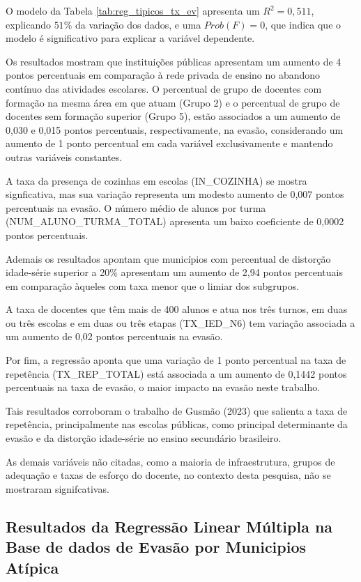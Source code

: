 \documentclass[english, spanish, brazilian]{RBIEarticle} %
\begin{document}
O modelo da Tabela \ref{tab:reg_tipicos_tx_ev} apresenta um $R^2=0,511$, explicando $51\%$ da variação dos dados, e uma $Prob(F)=0$, que indica que o modelo é significativo para explicar a variável dependente.

Os resultados mostram que instituições públicas apresentam um aumento de 4 pontos percentuais em comparação à rede privada de ensino no abandono contínuo das atividades escolares.
O percentual de grupo de docentes com formação na mesma área em que atuam (Grupo 2) e o percentual de grupo de docentes sem formação superior (Grupo 5), estão associados a um aumento de 0,030 e 0,015 pontos percentuais, respectivamente, na evasão, considerando um aumento de 1 ponto percentual em cada variável exclusivamente e mantendo outras variáveis constantes.

A taxa da presença de cozinhas em escolas (IN\_COZINHA) se mostra signficativa, mas sua variação representa um modesto aumento de 0,007 pontos percentuais na evasão. O número médio de alunos por turma (NUM\_ALUNO\_TURMA\_TOTAL) apresenta um baixo coeficiente de 0,0002 pontos percentuais. 

Ademais os resultados apontam que municípios com percentual de distorção idade-série superior a 20\% apresentam um aumento de 2,94 pontos percentuais em comparação àqueles com taxa menor que o limiar dos subgrupos.

A taxa de docentes que têm mais de 400 alunos e atua nos três turnos, em duas ou três escolas e em duas ou três etapas (TX\_IED\_N6) tem variação associada a um aumento de 0,02 pontos percentuais na evasão.

Por fim, a regressão aponta que uma variação de 1 ponto percentual na taxa de repetência (TX\_REP\_TOTAL) está associada a um aumento de 0,1442 pontos percentuais na taxa de evasão, o maior impacto na evasão neste trabalho.

Tais resultados corroboram o trabalho de Gusmão (2023) que salienta a taxa de repetência, principalmente nas escolas públicas, como principal determinante da evasão e da distorção idade-série no ensino secundário brasileiro. 

As demais variáveis não citadas, como a maioria de infraestrutura, grupos de adequação e taxas de esforço do docente, no contexto desta pesquisa, não se mostraram signifcativas.

\subsection{Resultados da Regressão Linear Múltipla na Base de dados de Evasão por Municipios Atípica}
\end{document}
